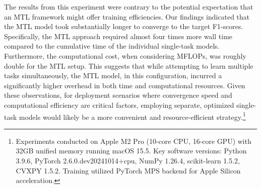 

The results from this experiment were contrary to the potential expectation that an MTL framework might offer training efficiencies. Our findings indicated that the MTL model took substantially longer to converge to the target F1-scores. Specifically, the MTL approach required almost four times more wall time compared to the cumulative time of the individual single-task models. Furthermore, the computational cost, when considering MFLOPs, was roughly double for the MTL setup. This suggests that while attempting to learn multiple tasks simultaneously, the MTL model, in this configuration, incurred a significantly higher overhead in both time and computational resources. Given these observations, for deployment scenarios where convergence speed and computational efficiency are critical factors, employing separate, optimized single-task models would likely be a more convenient and resource-efficient strategy.\footnote{Experiments conducted on Apple M2 Pro (10-core CPU, 16-core GPU) with 32GB unified memory running macOS 15.5. Key software versions: Python 3.9.6, PyTorch 2.6.0.dev20241014+cpu, NumPy 1.26.4, scikit-learn 1.5.2, CVXPY 1.5.2. Training utilized PyTorch MPS backend for Apple Silicon acceleration.}


%